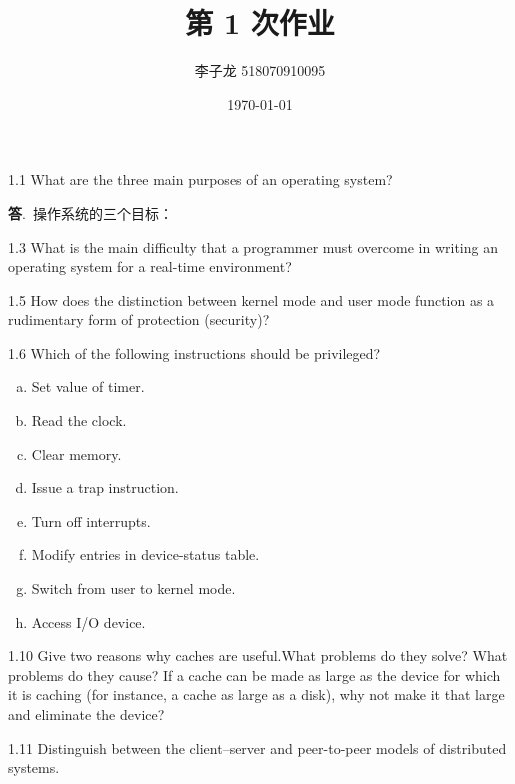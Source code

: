 \documentclass[12pt,a4paper]{article}
\newenvironment{problems}{\begin{list}{}{\renewcommand{\makelabel}[1]{\textbf{##1}\hfil}}}{\end{list}}
\providecommand{\ans}{\textbf{答}.~}
\begin{document}
\title{第 1 次作业}
\author{李子龙 518070910095}
\date{\today}
\maketitle

\begin{problems}
    \item[1.1] What are the three main purposes of an operating system?
    
    \ans 操作系统的三个目标：
    \item[1.3] What is the main difficulty that a programmer must overcome in writing
    an operating system for a real-time environment?
    \item[1.5] How does the distinction between kernel mode and user mode function
    as a rudimentary form of protection (security)?
    \item[1.6] Which of the following instructions should be privileged?
    \begin{enumerate}[a.]
        \item Set value of timer.
        \item Read the clock.
        \item Clear memory.
        \item Issue a trap instruction.
        \item Turn off interrupts.
        \item Modify entries in device-status table.
        \item Switch from user to kernel mode.
        \item Access I/O device.
    \end{enumerate} 
    \item[1.10] Give two reasons why caches are useful.What problems do they solve?
    What problems do they cause? If a cache can be made as large as the device for which it is caching (for instance, a cache as large as a disk),
    why not make it that large and eliminate the device?
    \item[1.11] Distinguish between the client–server and peer-to-peer models of distributed
    systems.
\end{problems}
\end{document}

